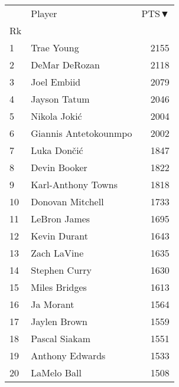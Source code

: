 \begin{tabular}{llr}
\toprule
{} &                 Player &  PTS▼ \\
Rk &                        &       \\
\midrule
1  &             Trae Young &  2155 \\
2  &          DeMar DeRozan &  2118 \\
3  &            Joel Embiid &  2079 \\
4  &           Jayson Tatum &  2046 \\
5  &           Nikola Jokić &  2004 \\
6  &  Giannis Antetokounmpo &  2002 \\
7  &            Luka Dončić &  1847 \\
8  &           Devin Booker &  1822 \\
9  &     Karl-Anthony Towns &  1818 \\
10 &       Donovan Mitchell &  1733 \\
11 &           LeBron James &  1695 \\
12 &           Kevin Durant &  1643 \\
13 &            Zach LaVine &  1635 \\
14 &          Stephen Curry &  1630 \\
15 &          Miles Bridges &  1613 \\
16 &              Ja Morant &  1564 \\
17 &           Jaylen Brown &  1559 \\
18 &          Pascal Siakam &  1551 \\
19 &        Anthony Edwards &  1533 \\
20 &            LaMelo Ball &  1508 \\
\bottomrule
\end{tabular}
